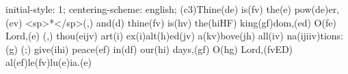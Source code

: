 initial-style: 1;
centering-scheme: english;
(c3)Thine(de) is(fv) the(e) pow(de)er,(ev) <sp>*</sp>(,) and(d) thine(fv) is(hv) the(hiHF) king(gf)dom,(ed) O(fe) Lord,(e) (,) thou(eijv) art(i) ex(i)alt(h)ed(jv) a(kv)bove(jh) all(iv) na(ijiiv)tions:(g) (;) give(ihi) peace(ef) in(df) our(hi) days,(gf) O(hg) Lord,(fvED) al(ef)le(fv)lu(e)ia.(e)

